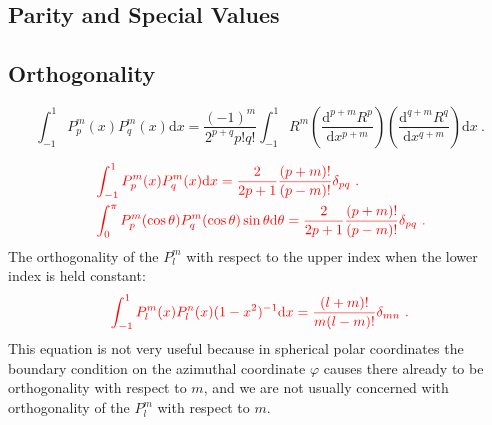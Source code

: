 \documentclass[12pt,a4paper]{article}
\newcommand{\dif}{\mathrm{d}}
\begin{document}
\subsection{Parity and Special Values}





\subsection{Orthogonality}
\begin{equation}
\int_{-1}^1 P_p^m(x) P_q^m(x) \dif x = \dfrac{(-1)^m}{2^{p+q} p! q!} \int_{-1}^1 R^m \left(\dfrac{\dif^{p+m} R^p}{\dif x^{p+m}}  \right)  \left(\dfrac{\dif^{q+m} R^q}{\dif x^{q+m}}  \right) \dif x ~.
\end{equation}




















\begin{align}
& \color{red} \int_{-1}^1 P_p^m(x) P_q^m(x) \dif x = \dfrac{2}{2p+1} \dfrac{(p+m)!}{(p-m)!} \delta_{pq} ~. \\
& \color{red} \int_{0}^\pi P_p^m(\cos \theta) P_q^m(\cos \theta) \sin \theta \dif \theta = \dfrac{2}{2p+1} \dfrac{(p+m)!}{(p-m)!} \delta_{pq} ~. 
\end{align}
The orthogonality of the $P_l^m$ with respect to the upper index when the lower index is held constant:
\begin{equation}
\color{red} \int_{-1}^1 P_l^m(x) P_l^n(x) (1-x^2)^{-1} \dif x = \dfrac{(l+m)!}{m(l-m)!} \delta_{mn} ~.
\end{equation}
This equation is not very useful because in spherical polar coordinates the boundary condition on the azimuthal coordinate $\varphi$ causes there already to be orthogonality with respect to $m$, and we are not usually concerned with orthogonality of the $P_l^m$ with respect to $m$.
\end{document}
